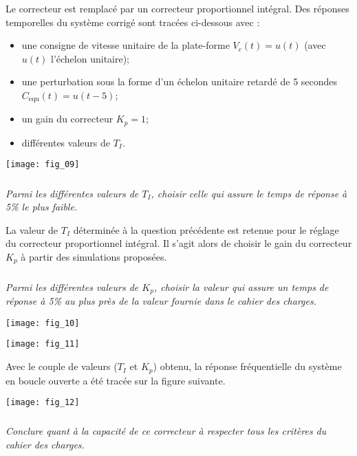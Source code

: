 \begin{multicols}{2}
Le correcteur est remplacé par un correcteur proportionnel intégral. Des réponses temporelles du système corrigé sont
tracées ci-dessous avec :
\begin{itemize}
\item une consigne de vitesse unitaire de la plate-forme $V_c(t)= u(t)$ (avec $u(t)$ l’échelon unitaire);
\item une perturbation sous la forme d’un échelon unitaire retardé de 5 secondes $C_{\text{equ}} (t) = u(t - 5)$;
\item un gain du correcteur $K_p = 1$;
\item différentes valeurs de $T_I$.
\end{itemize}


\begin{center}
\texttt{[image: fig\_09]}
\end{center}

\subparagraph{}\textit{Parmi les différentes valeurs de $T_I$, choisir celle qui assure le temps de réponse à 5\% le plus faible.}
\ifprof
\begin{corrige}
\end{corrige}
\else
\fi

La valeur de $T_I$ déterminée à la question précédente est retenue pour le réglage du correcteur proportionnel intégral.
Il s’agit alors de choisir le gain du correcteur $K_p$ à partir des simulations proposées.

\subparagraph{}\textit{Parmi les différentes valeurs de $K_p$, choisir la valeur qui assure un temps de réponse à 5\% au plus près de la valeur fournie dans le cahier des charges.}
\ifprof
\begin{corrige}
\end{corrige}
\else
\fi
\begin{center}
\texttt{[image: fig\_10]}
\end{center}

\begin{center}
\texttt{[image: fig\_11]}
\end{center}
Avec le couple de valeurs ($T_I$ et $K_p$) obtenu, la réponse fréquentielle du système en boucle ouverte a été tracée sur la figure suivante.

\begin{center}
\texttt{[image: fig\_12]}
\end{center}


\subparagraph{}\textit{Conclure quant à la capacité de ce correcteur à respecter tous les critères du cahier des charges.}
\ifprof
\begin{corrige}
\end{corrige}
\else
\fi


\end{multicols}

%
%
%
%
%
%
